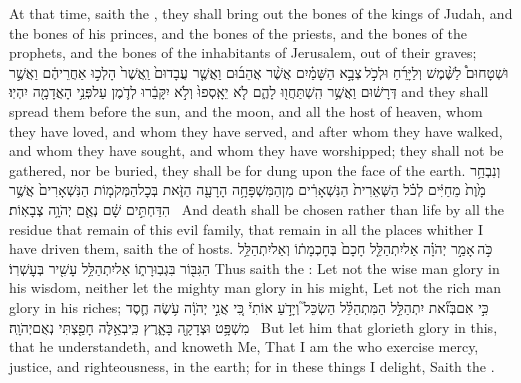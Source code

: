 {At that time, saith the \lord, they shall bring out the bones of the kings of Judah, and the bones of his princes, and the bones of the priests, and the bones of the prophets, and the bones of the inhabitants of Jerusalem, out of their graves;}
{וּשְׁטָחוּם֩ לַשֶּׁ֨מֶשׁ וְלַיָּרֵ֜חַ וּלְכֹ֣ל \legarmeh  צְבָ֣א הַשָּׁמַ֗יִם אֲשֶׁ֨ר אֲהֵב֜וּם וַאֲשֶׁ֤ר עֲבָדוּם֙ וַֽאֲשֶׁר֙ הָלְכ֣וּ אַחֲרֵיהֶ֔ם וַאֲשֶׁ֣ר דְּרָשׁ֔וּם וַאֲשֶׁ֥ר הִֽשְׁתַּחֲו֖וּ לָהֶ֑ם לֹ֤א יֵאָֽסְפוּ֙ וְלֹ֣א יִקָּבֵ֔רוּ לְדֹ֛מֶן עַל\maqqaf פְּנֵ֥י הָאֲדָמָ֖ה יִהְיֽוּ׃}
{and they shall spread them before the sun, and the moon, and all the host of heaven, whom they have loved, and whom they have served, and after whom they have walked, and whom they have sought, and whom they have worshipped; they shall not be gathered, nor be buried, they shall be for dung upon the face of the earth.}
{וְנִבְחַ֥ר מָ֙וֶת֙ מֵחַיִּ֔ים לְכֹ֗ל הַשְּׁאֵרִית֙ הַנִּשְׁאָרִ֔ים מִן\maqqaf הַמִּשְׁפָּחָ֥ה הָרָעָ֖ה הַזֹּ֑את בְּכׇל\maqqaf הַמְּקֹמ֤וֹת הַנִּשְׁאָרִים֙ אֲשֶׁ֣ר הִדַּחְתִּ֣ים שָׁ֔ם נְאֻ֖ם יְהֹוָ֥ה צְבָאֽוֹת׃ \setuma }
{And death shall be chosen rather than life by all the residue that remain of this evil family, that remain in all the places whither I have driven them, saith the \lord\space of hosts.}
\newperek
\setcounter{chap}{9}
\setcounter{verse}{22}
{כֹּ֣ה \legarmeh  אָמַ֣ר יְהֹוָ֗ה אַל\maqqaf יִתְהַלֵּ֤ל חָכָם֙ בְּחׇכְמָת֔וֹ וְאַל\maqqaf יִתְהַלֵּ֥ל הַגִּבּ֖וֹר בִּגְבֽוּרָת֑וֹ אַל\maqqaf יִתְהַלֵּ֥ל עָשִׁ֖יר בְּעׇשְׁרֽוֹ׃}
{Thus saith the \lord: Let not the wise man glory in his wisdom, neither let the mighty man glory in his might, Let not the rich man glory in his riches;}
{כִּ֣י אִם\maqqaf בְּזֹ֞את יִתְהַלֵּ֣ל הַמִּתְהַלֵּ֗ל הַשְׂכֵּל֮ וְיָדֹ֣עַ אוֹתִי֒ כִּ֚י אֲנִ֣י יְהֹוָ֔ה עֹ֥שֶׂה חֶ֛סֶד מִשְׁפָּ֥ט וּצְדָקָ֖ה בָּאָ֑רֶץ כִּֽי\maqqaf בְאֵ֥לֶּה חָפַ֖צְתִּי נְאֻם\maqqaf יְהֹוָֽה׃ \setuma }
{But let him that glorieth glory in this, that he understandeth, and knoweth Me, That I am the \lord\space who exercise mercy, justice, and righteousness, in the earth; for in these things I delight, Saith the \lord.}
\label{haft_26}
\setcounter{chap}{6}
\setcounter{verse}{1}

